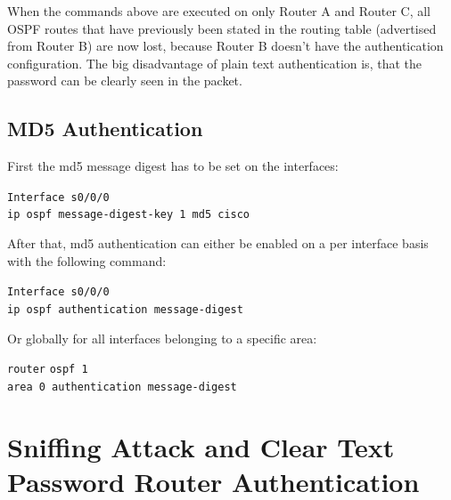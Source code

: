 When the commands above are executed on only Router A and Router C, all OSPF routes that have previously been stated in the routing table (advertised from Router B) are now lost, because Router B doesn’t have the authentication configuration.
The big disadvantage of plain text authentication is, that the password can be clearly seen in the packet.

\pagebreak
\section{MD5 Authentication}

First the md5 message digest has to be set on the interfaces:
\begin{tabbing}
\texttt{Interf}\= \texttt{ace s0/0/0} \\
\> \texttt{ip ospf message-digest-key 1 md5 cisco}
\end{tabbing}

After that, md5 authentication can either be enabled on a per interface basis with the following command:
\begin{tabbing}
\texttt{Interf}\= \texttt{ace s0/0/0} \\
\> \texttt{ip ospf authentication message-digest}
\end{tabbing}
   
Or globally for all interfaces belonging to a specific area:
\begin{tabbing}
\texttt{router} \= \texttt{ospf 1} \\
\> \texttt{area 0 authentication message-digest}
\end{tabbing}

\chapter{Sniffing Attack and Clear Text Password Router Authentication}